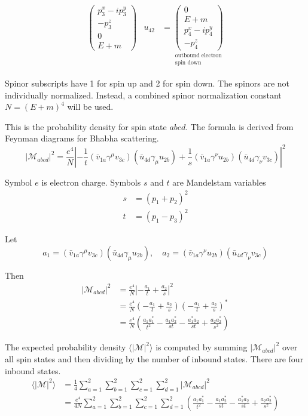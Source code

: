 \documentclass[12pt]{article}
\begin{document}
\begin{align*}
{
\begin{pmatrix}p_3^x-ip_3^y\\-p_3^z\\0\\E+m\end{pmatrix}
}
&
u_{42}&=
\underset{\substack{\text{outbound electron}\\\text{spin down}}}
{
\begin{pmatrix}0\\E+m\\p_4^x-ip_4^y\\-p_4^z\end{pmatrix}
}
\end{align*}

Spinor subscripts have 1 for spin up and 2 for spin down.
The spinors are not individually normalized.
Instead, a combined spinor normalization constant $N=(E+m)^4$ will be used.

\bigskip
This is the probability density for spin state $abcd$.
The formula is derived from Feynman diagrams for Bhabha scattering.
\begin{equation*}
|\mathcal{M}_{abcd}|^2=\frac{e^4}{N}
\left|
-\frac{1}{t}(\bar{v}_{1a}\gamma^\mu v_{3c})(\bar{u}_{4d}\gamma_\mu u_{2b})
+\frac{1}{s}(\bar{v}_{1a}\gamma^\nu u_{2b})(\bar{u}_{4d}\gamma_\nu v_{3c})
\right|^2
\end{equation*}

Symbol $e$ is electron charge.
Symbols $s$ and $t$ are Mandelstam variables
\begin{align*}
s&=(p_1+p_2)^2
\\
t&=(p_1-p_3)^2
\end{align*}

Let
\begin{equation*}
a_1=(\bar{v}_{1a}\gamma^\mu v_{3c})(\bar{u}_{4d}\gamma_\mu u_{2b}),
\quad
a_2=(\bar{v}_{1a}\gamma^\nu u_{2b})(\bar{u}_{4d}\gamma_\nu v_{3c})
\end{equation*}

Then
\begin{align*}
|\mathcal{M}_{abcd}|^2
&=
\frac{e^4}{N}\left|{-\frac{a_1}{t}} + \frac{a_2}{s}\right|^2\\
&=
\frac{e^4}{N}\left(-\frac{a_1}{t} + \frac{a_2}{s}\right)\left(-\frac{a_1}{t} + \frac{a_2}{s}\right)^*\\
&=
\frac{e^4}{N}
\left(
\frac{a_1a_1^*}{t^2} - \frac{a_1a_2^*}{st} -
\frac{a_1^*a_2}{st} + \frac{a_2a_2^*}{s^2}
\right)
\end{align*}

The expected probability density $\langle|\mathcal{M}|^2\rangle$ is computed
by summing $|\mathcal{M}_{abcd}|^2$ over all spin states and then dividing by the number of inbound states.
There are four inbound states.
\begin{align*}
\langle|\mathcal{M}|^2\rangle
&=
\frac{1}{4}\sum_{a=1}^2\sum_{b=1}^2\sum_{c=1}^2\sum_{d=1}^2
|\mathcal{M}_{abcd}|^2\\
&=
\frac{e^4}{4N}\sum_{a=1}^2\sum_{b=1}^2\sum_{c=1}^2\sum_{d=1}^2
\left(
\frac{a_1a_1^*}{t^2} - \frac{a_1a_2^*}{st} -
\frac{a_1^*a_2}{st} + \frac{a_2a_2^*}{s^2}
\right)
\end{align*}
\end{document}
